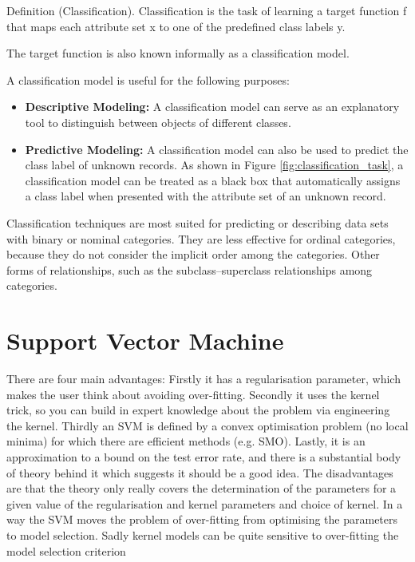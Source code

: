 Definition (Classification). Classification is the task of learning a target function f that maps each attribute set x to one of the predefined class labels y.

The target function is also known informally as a classification model.

A classification model is useful for the following purposes:

\begin{itemize}
\item \textbf{Descriptive Modeling:} A classification model can serve as an explanatory tool to distinguish between objects of different classes.

\item \textbf{Predictive Modeling:} A classification model can also be used to predict the class label of unknown records. As shown in Figure \ref{fig:classification_task}, a classification model can be treated as a black box that automatically assigns a class label when presented with the attribute set of an unknown record.
\end{itemize}

Classification techniques are most suited for predicting or describing data sets with binary or nominal categories. They are less effective for ordinal categories, because they do not consider the implicit order among the categories. Other forms of relationships, such as the subclass–superclass relationships among categories.

\section{Support Vector Machine}

There are four main advantages: Firstly it has a regularisation parameter, which makes the user think about avoiding over-fitting. Secondly it uses the kernel trick, so you can build in expert knowledge about the problem via engineering the kernel. Thirdly an SVM is defined by a convex optimisation problem (no local minima) for which there are efficient methods (e.g. SMO). Lastly, it is an approximation to a bound on the test error rate, and there is a substantial body of theory behind it which suggests it should be a good idea.
The disadvantages are that the theory only really covers the determination of the parameters for a given value of the regularisation and kernel parameters and choice of kernel. In a way the SVM moves the problem of over-fitting from optimising the parameters to model selection. Sadly kernel models can be quite sensitive to over-fitting the model selection criterion \cite{cawley2010over}

